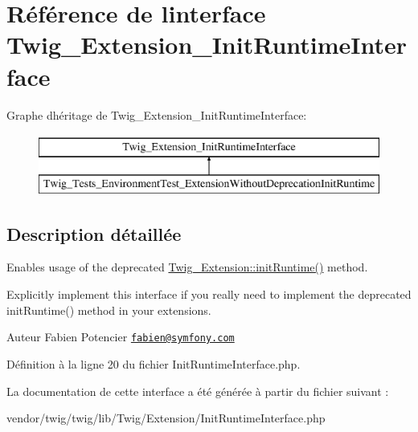 \hypertarget{interface_twig___extension___init_runtime_interface}{}\section{Référence de l\textquotesingle{}interface Twig\+\_\+\+Extension\+\_\+\+Init\+Runtime\+Interface}
\label{interface_twig___extension___init_runtime_interface}
Graphe d\textquotesingle{}héritage de Twig\+\_\+\+Extension\+\_\+\+Init\+Runtime\+Interface\+:\begin{figure}[H]
\begin{center}
\leavevmode
\includegraphics[height=2.000000cm]{interface_twig___extension___init_runtime_interface}
\end{center}
\end{figure}


\subsection{Description détaillée}
Enables usage of the deprecated \hyperlink{class_twig___extension_ab17a2e5ce3e5789febe1f3a96e61ec38}{Twig\+\_\+\+Extension\+::init\+Runtime()} method.

Explicitly implement this interface if you really need to implement the deprecated init\+Runtime() method in your extensions.

\begin{DoxyAuthor}{Auteur}
Fabien Potencier \href{mailto:fabien@symfony.com}{\tt fabien@symfony.\+com} 
\end{DoxyAuthor}


Définition à la ligne 20 du fichier Init\+Runtime\+Interface.\+php.



La documentation de cette interface a été générée à partir du fichier suivant \+:\begin{DoxyCompactItemize}
\item 
vendor/twig/twig/lib/\+Twig/\+Extension/Init\+Runtime\+Interface.\+php\end{DoxyCompactItemize}
